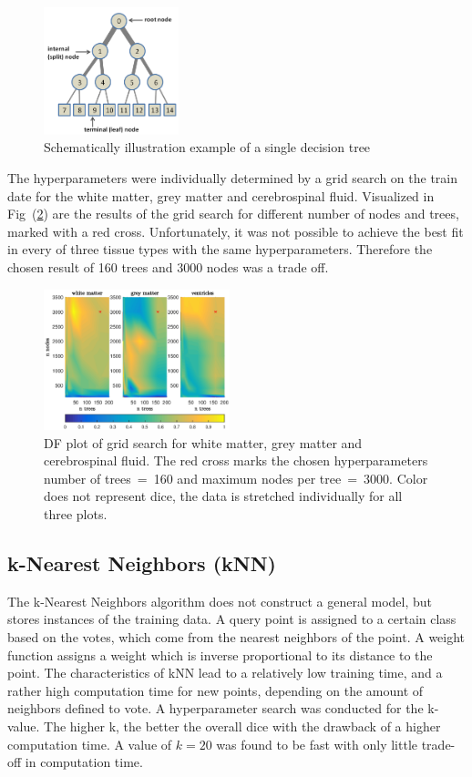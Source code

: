 \documentclass[journal]{IEEEtran}
\begin{document}
\begin{figure}[h!]
	\centering
	\includegraphics[width=0.35\textwidth]{images/DF}
	\caption{Schematically illustration example of a single decision tree}\label{f.df}
\end{figure}


The hyperparameters were individually determined by a grid search on the train date for the white matter, grey matter and cerebrospinal fluid. Visualized in Fig~(\ref{f.df_gridsearch}) are the results of the grid search for different number of nodes and trees, marked with a red cross. Unfortunately, it was not possible to achieve the best fit in every of three tissue types with the same hyperparameters. Therefore the chosen result of 160 trees and 3000 nodes was a trade off.

\begin{figure}[h!]
	\centering
	\includegraphics[width=0.48\textwidth]{images/df_grid}
	\caption{DF plot of grid search for white matter, grey matter and cerebrospinal fluid. The red cross marks the chosen hyperparameters number of trees~=~160 and maximum nodes per tree~=~3000. Color does not represent dice, the data is stretched individually for all three plots.}\label{f.df_gridsearch}
\end{figure}

\subsection{k-Nearest Neighbors (kNN)}
The k-Nearest Neighbors algorithm does not construct a general model, but stores instances of the training data. A query point is assigned to a certain class based on the votes, which come from the nearest neighbors of the point. A weight function assigns a weight which is inverse proportional to its distance to the point. The characteristics of kNN lead to a relatively low training time, and a rather high computation time for new points, depending on the amount of neighbors defined to vote. A hyperparameter search was conducted for the k-value. The higher k, the better the overall dice with the drawback of a higher computation time. A value of $k=20$ was found to be fast with only little trade-off in computation time.
\end{document}
